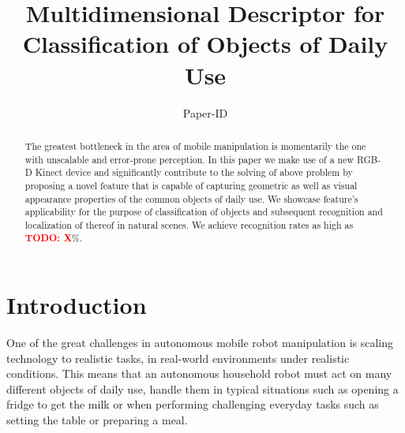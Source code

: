 \documentclass[conference]{sty/IEEEtran}
\begin{document}
\title{Multidimensional Descriptor for Classification of Objects of Daily Use}

\author{Paper-ID }


\newcommand{\todo}[1]{\textbf{\textcolor{red}{TODO: #1}}}
\maketitle

\begin{abstract}
The greatest bottleneck in the area of mobile manipulation is momentarily the one
with unscalable and error-prone perception. In this paper we make use of a new
RGB-D Kinect device and significantly contribute to the solving of above problem
by proposing a novel feature that is capable of capturing geometric as well as
visual appearance properties of the common objects of daily use. We showcase
feature's applicability for the purpose of classification of objects and subsequent
recognition and localization of thereof in natural scenes. We achieve recognition
rates as high as \todo{X}\%.
\end{abstract}

\IEEEpeerreviewmaketitle

\section{Introduction}
One of the great challenges in autonomous mobile robot manipulation is scaling
technology to realistic tasks, in real-world environments under realistic
conditions. This means that an autonomous household robot must act on many
different objects of daily use, handle them in typical situations such as
opening a fridge to get the milk or when performing challenging everyday tasks
such as setting the table or preparing a meal.
\end{document}

